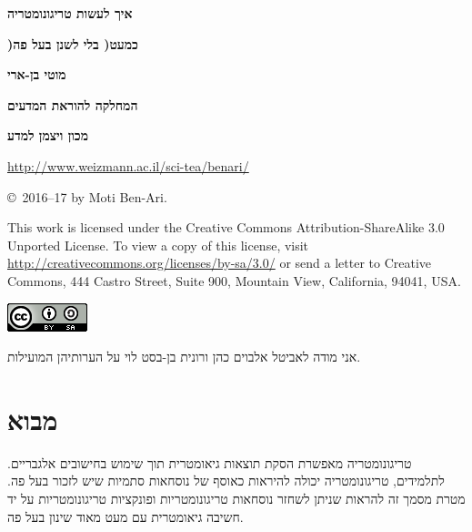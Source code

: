 \documentclass[12pt,a4paper]{article}
\begin{document}
\thispagestyle{empty}


\begin{center}
\textbf{\Huge איך לעשות טריגונומטריה}

\bigskip

\textbf{\Huge )כמעט( בלי לשנן בעל פה}

\bigskip
\bigskip

\textbf{\Large מוטי בן-ארי}

\bigskip

\textbf{\Large המחלקה להוראת המדעים}

\bigskip

\textbf{\Large מכון ויצמן למדע}

\bigskip

\url{http://www.weizmann.ac.il/sci-tea/benari/}

\bigskip

\end{center}


\begin{center}
\copyright{}\  2016--17 by Moti Ben-Ari.
\end{center}

This work is licensed under the Creative Commons Attribution-ShareAlike 3.0 Unported License. To view a copy of this license, visit \url{http://creativecommons.org/licenses/by-sa/3.0/} or send a letter to Creative Commons, 444 Castro Street, Suite 900, Mountain View, California, 94041, USA.

\bigskip

\begin{center}
\includegraphics[width=.2\textwidth]{../by-sa.png}
\end{center}

\bigskip


אני מודה לאביטל אלבוים כהן ורונית בן-בסט לוי על הערותיהן המועילות.

\bigskip
\bigskip

\section{מבוא}

טריגונומטריה מאפשרת הסקת תוצאות גיאומטרית תוך שימוש בחישובים אלגבריים. לתלמידים, טריגונומטריה יכולה להיראות כאוסף של נוסחאות סתמיות שיש לזכור בעל פה. מטרת מסמך זה להראות שניתן לשחזר נוסחאות טריגונומטריות ופונקציות טריגונומטריות על יד חשיבה גיאומטרית עם מעט מאוד שינון בעל פה.
\end{document}
